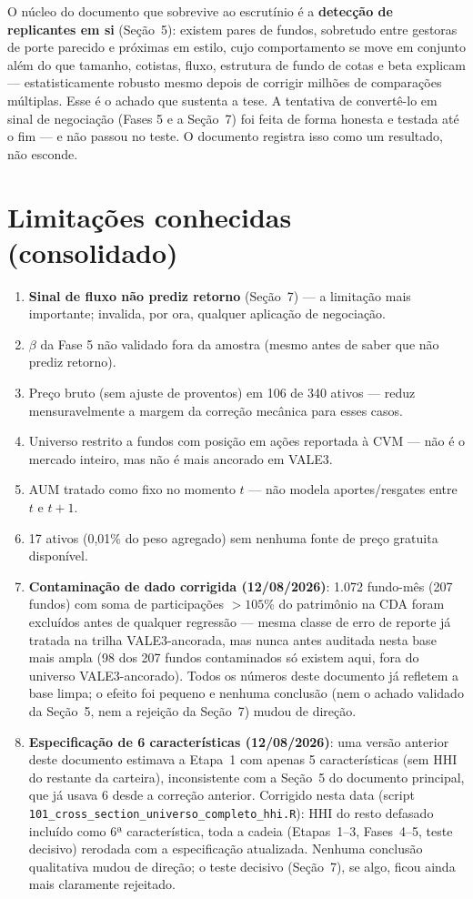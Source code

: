 \documentclass[11pt,a4paper]{article}
\begin{document}
O núcleo do documento que sobrevive ao escrutínio é a \textbf{detecção de replicantes em si}
(Seção~5): existem pares de fundos, sobretudo entre gestoras de porte parecido e próximas em
estilo, cujo comportamento se move em conjunto além do que tamanho, cotistas, fluxo, estrutura
de fundo de cotas e beta explicam --- estatisticamente robusto mesmo depois de corrigir
milhões de comparações múltiplas. Esse é o achado que sustenta a tese. A tentativa de convertê-lo
em sinal de negociação (Fases 5 e a Seção~7) foi feita de forma honesta e testada até o fim ---
e não passou no teste. O documento registra isso como um resultado, não esconde.

\section{Limitações conhecidas (consolidado)}

\begin{enumerate}[topsep=4pt,itemsep=2pt]
\item \textbf{Sinal de fluxo não prediz retorno} (Seção~7) --- a limitação mais importante;
invalida, por ora, qualquer aplicação de negociação.
\item $\beta$ da Fase 5 não validado fora da amostra (mesmo antes de saber que não prediz
retorno).
\item Preço bruto (sem ajuste de proventos) em 106 de 340 ativos --- reduz mensuravelmente a
margem da correção mecânica para esses casos.
\item Universo restrito a fundos com posição em ações reportada à CVM --- não é o mercado
inteiro, mas não é mais ancorado em VALE3.
\item AUM tratado como fixo no momento $t$ --- não modela aportes/resgates entre $t$ e $t+1$.
\item 17 ativos (0,01\% do peso agregado) sem nenhuma fonte de preço gratuita disponível.
\item \textbf{Contaminação de dado corrigida (12/08/2026)}: 1.072 fundo-mês (207 fundos) com
soma de participações $>105\%$ do patrimônio na CDA foram excluídos antes de qualquer
regressão --- mesma classe de erro de reporte já tratada na trilha VALE3-ancorada, mas nunca
antes auditada nesta base mais ampla (98 dos 207 fundos contaminados só existem aqui, fora do
universo VALE3-ancorado). Todos os números deste documento já refletem a base limpa; o efeito
foi pequeno e nenhuma conclusão (nem o achado validado da Seção~5, nem a rejeição da
Seção~7) mudou de direção.
\item \textbf{Especificação de 6 características (12/08/2026)}: uma versão anterior deste
documento estimava a Etapa~1 com apenas 5 características (sem HHI do restante da carteira),
inconsistente com a Seção~5 do documento principal, que já usava 6 desde a correção anterior.
Corrigido nesta data (script \texttt{101\_cross\_section\_universo\_completo\_hhi.R}): HHI do
resto defasado incluído como 6ª característica, toda a cadeia (Etapas~1--3, Fases~4--5, teste
decisivo) rerodada com a especificação atualizada. Nenhuma conclusão qualitativa mudou de
direção; o teste decisivo (Seção~7), se algo, ficou ainda mais claramente rejeitado.
\end{enumerate}
\end{document}
